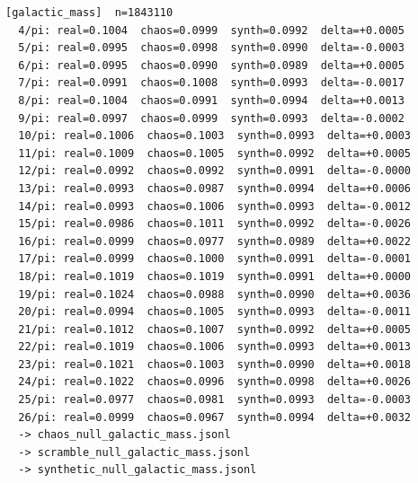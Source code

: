 \documentclass[11pt, letterpaper, openany]{book}
\begin{document}
\begin{empiricalbox}
\begin{lstlisting}[style=terminal]
[galactic_mass]  n=1843110
  4/pi: real=0.1004  chaos=0.0999  synth=0.0992  delta=+0.0005
  5/pi: real=0.0995  chaos=0.0998  synth=0.0990  delta=-0.0003
  6/pi: real=0.0995  chaos=0.0990  synth=0.0989  delta=+0.0005
  7/pi: real=0.0991  chaos=0.1008  synth=0.0993  delta=-0.0017
  8/pi: real=0.1004  chaos=0.0991  synth=0.0994  delta=+0.0013
  9/pi: real=0.0997  chaos=0.0999  synth=0.0993  delta=-0.0002
  10/pi: real=0.1006  chaos=0.1003  synth=0.0993  delta=+0.0003
  11/pi: real=0.1009  chaos=0.1005  synth=0.0992  delta=+0.0005
  12/pi: real=0.0992  chaos=0.0992  synth=0.0991  delta=-0.0000
  13/pi: real=0.0993  chaos=0.0987  synth=0.0994  delta=+0.0006
  14/pi: real=0.0993  chaos=0.1006  synth=0.0993  delta=-0.0012
  15/pi: real=0.0986  chaos=0.1011  synth=0.0992  delta=-0.0026
  16/pi: real=0.0999  chaos=0.0977  synth=0.0989  delta=+0.0022
  17/pi: real=0.0999  chaos=0.1000  synth=0.0991  delta=-0.0001
  18/pi: real=0.1019  chaos=0.1019  synth=0.0991  delta=+0.0000
  19/pi: real=0.1024  chaos=0.0988  synth=0.0990  delta=+0.0036
  20/pi: real=0.0994  chaos=0.1005  synth=0.0993  delta=-0.0011
  21/pi: real=0.1012  chaos=0.1007  synth=0.0992  delta=+0.0005
  22/pi: real=0.1019  chaos=0.1006  synth=0.0993  delta=+0.0013
  23/pi: real=0.1021  chaos=0.1003  synth=0.0990  delta=+0.0018
  24/pi: real=0.1022  chaos=0.0996  synth=0.0998  delta=+0.0026
  25/pi: real=0.0977  chaos=0.0981  synth=0.0993  delta=-0.0003
  26/pi: real=0.0999  chaos=0.0967  synth=0.0994  delta=+0.0032
  -> chaos_null_galactic_mass.jsonl
  -> scramble_null_galactic_mass.jsonl
  -> synthetic_null_galactic_mass.jsonl


\end{lstlisting}
\end{empiricalbox}
\end{document}
